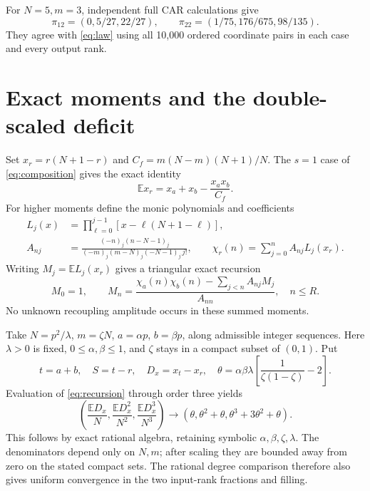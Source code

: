 \documentclass[11pt,a4paper]{article}
\newcommand{\EE}{\mathbb E}
\begin{document}
For $N=5,m=3$, independent full CAR calculations give
\begin{equation}
 \pi_{12}=(0,5/27,22/27),\qquad
 \pi_{22}=(1/75,176/675,98/135).
\end{equation}
They agree with \eqref{eq:law} using all 10,000 ordered coordinate
pairs in each case and every output rank.

\newpage
\section{Exact moments and the double-scaled deficit}
Set $x_r=r(N+1-r)$ and $C_f=m(N-m)(N+1)/N$. The $s=1$ case of
\eqref{eq:composition} gives the exact identity
\begin{equation}
 \EE x_r=x_a+x_b-\frac{x_ax_b}{C_f}.
\end{equation}
For higher moments define the monic polynomials and coefficients
\begin{align}
 L_j(x)&=\prod_{\ell=0}^{j-1}[x-\ell(N+1-\ell)],\\
 A_{nj}&=\frac{(-n)_j(n-N-1)_j}
 {(-m)_j(m-N)_j(-N-1)_j\,j!},\qquad
 \chi_r(n)=\sum_{j=0}^n A_{nj}L_j(x_r).
\end{align}
Writing $M_j=\EE L_j(x_r)$ gives a triangular exact recursion
\begin{equation}
 M_0=1,\qquad
 M_n=\frac{\chi_a(n)\chi_b(n)-\sum_{j<n}A_{nj}M_j}{A_{nn}},
 \quad n\le R. \label{eq:recursion}
\end{equation}
No unknown recoupling amplitude occurs in these summed moments.

Take $N=p^2/\lambda$, $m=\zeta N$,
$a=\alpha p$, $b=\beta p$, along admissible integer sequences.
Here $\lambda>0$ is fixed, $0\le\alpha,\beta\le1$, and $\zeta$
stays in a compact subset of $(0,1)$. Put
\begin{equation}
 t=a+b,\quad S=t-r,\quad D_x=x_t-x_r,
 \quad \theta=\alpha\beta\lambda
            \left[\frac1{\zeta(1-\zeta)}-2\right].
\end{equation}
Evaluation of \eqref{eq:recursion} through order three yields
\begin{equation}
 \left(\frac{\EE D_x}{N},\frac{\EE D_x^2}{N^2},
                    \frac{\EE D_x^3}{N^3}\right)
 \longrightarrow(\theta,\theta^2+\theta,
                         \theta^3+3\theta^2+\theta).
 \label{eq:three}
\end{equation}
This follows by exact rational algebra, retaining symbolic
$\alpha,\beta,\zeta,\lambda$. The denominators depend only on
$N,m$; after scaling they are bounded away from zero on the stated
compact sets. The rational degree comparison therefore also gives
uniform convergence in the two input-rank fractions and filling.
\end{document}
